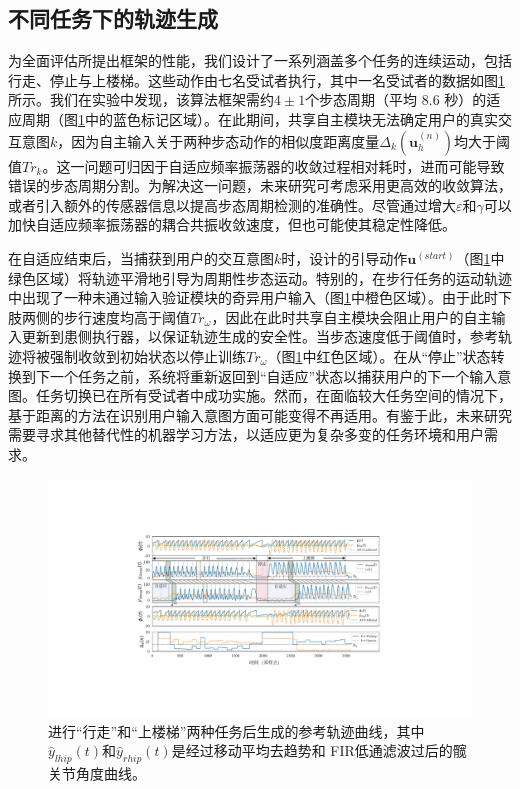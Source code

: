 \subsection{不同任务下的轨迹生成}为全面评估所提出框架的性能，我们设计了一系列涵盖多个任务的连续运动，包括行走、停止与上楼梯。这些动作由七名受试者执行，其中一名受试者的数据如图\ref{fig:5-6}所示。我们在实验中发现，该算法框架需约$4\pm 1$个步态周期（平均 8.6 秒）的适应周期（图\ref{fig:5-6}中的蓝色标记区域）。在此期间，共享自主模块无法确定用户的真实交互意图${k}$，因为自主输入关于两种步态动作的相似度距离度量${\Delta _k}(\pmb{u}_h^{(n)})$均大于阈值$T{r_k}$。这一问题可归因于自适应频率振荡器的收敛过程相对耗时，进而可能导致错误的步态周期分割。为解决这一问题，未来研究可考虑采用更高效的收敛算法，或者引入额外的传感器信息以提高步态周期检测的准确性。尽管通过增大$\varepsilon $和$\gamma $可以加快自适应频率振荡器的耦合共振收敛速度，但也可能使其稳定性降低。

在自适应结束后，当捕获到用户的交互意图${k}$时，设计的引导动作${\pmb{u}^{(start)}}$（图\ref{fig:5-6}中绿色区域）将轨迹平滑地引导为周期性步态运动。特别的，在步行任务的运动轨迹中出现了一种未通过输入验证模块的奇异用户输入（图\ref{fig:5-6}中橙色区域）。由于此时下肢两侧的步行速度均高于阈值$T{r_\omega}$，因此在此时共享自主模块会阻止用户的自主输入更新到患侧执行器，以保证轨迹生成的安全性。当步态速度低于阈值时，参考轨迹将被强制收敛到初始状态以停止训练$T{r_\omega }$（图\ref{fig:5-6}中红色区域）。在从``停止''状态转换到下一个任务之前，系统将重新返回到``自适应''状态以捕获用户的下一个输入意图。任务切换已在所有受试者中成功实施。然而，在面临较大任务空间的情况下，基于距离的方法在识别用户输入意图方面可能变得不再适用。有鉴于此，未来研究需要寻求其他替代性的机器学习方法，以适应更为复杂多变的任务环境和用户需求。
\begin{figure}[htb]
  \centering\includegraphics[width=1\textwidth]{figures/5-Fig-6.pdf}
  \caption{进行“行走”和“上楼梯”两种任务后生成的参考轨迹曲线，其中${\hat y_{lhip}}(t)$和${\hat y_{rhip}}(t)$是经过移动平均去趋势和 FIR低通滤波过后的髋关节角度曲线。}
  \label{fig:5-6}
\end{figure}

